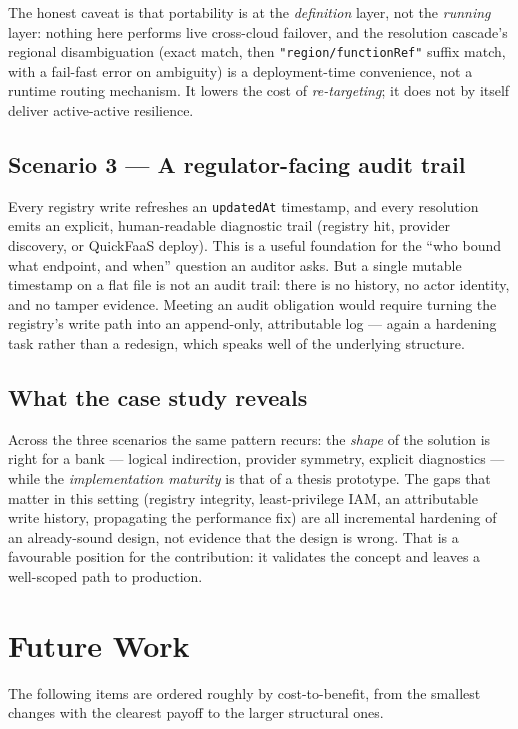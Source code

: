 The honest caveat is that portability is at the \emph{definition} layer, not the \emph{running}
layer: nothing here performs live cross-cloud failover, and the resolution cascade's regional
disambiguation (exact match, then \texttt{"region/functionRef"} suffix match, with a fail-fast
error on ambiguity) is a deployment-time convenience, not a runtime routing mechanism. It lowers
the cost of \emph{re-targeting}; it does not by itself deliver active-active resilience.

\subsection{Scenario 3 --- A regulator-facing audit trail}

Every registry write refreshes an \texttt{updatedAt} timestamp, and every resolution emits an
explicit, human-readable diagnostic trail (registry hit, provider discovery, or QuickFaaS
deploy). This is a useful foundation for the ``who bound what endpoint, and when'' question an
auditor asks. But a single mutable timestamp on a flat file is not an audit trail: there is no
history, no actor identity, and no tamper evidence. Meeting an audit obligation would require
turning the registry's write path into an append-only, attributable log --- again a hardening
task rather than a redesign, which speaks well of the underlying structure.

\subsection{What the case study reveals}

Across the three scenarios the same pattern recurs: the \emph{shape} of the solution is right
for a bank --- logical indirection, provider symmetry, explicit diagnostics --- while the
\emph{implementation maturity} is that of a thesis prototype. The gaps that matter in this
setting (registry integrity, least-privilege IAM, an attributable write history, propagating the
performance fix) are all incremental hardening of an already-sound design, not evidence that the
design is wrong. That is a favourable position for the contribution: it validates the concept and
leaves a well-scoped path to production.

\section{Future Work}
\label{sec:future-work}

The following items are ordered roughly by cost-to-benefit, from the smallest changes with the
clearest payoff to the larger structural ones.

